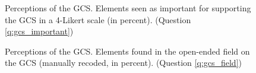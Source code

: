 \begin{figure}[h!]
    \caption[Perceptions of the GCS]{Perceptions of the GCS. Elements seen as important for supporting the GCS in a 4-Likert scale (in percent). (Question \ref{q:gcs_important})}\label{fig:gcs_important}
\end{figure}

\begin{figure}[h!]
    \caption[Classification of open-ended field on the GCS]{Perceptions of the GCS. Elements found in the open-ended field on the GCS (manually recoded, in percent). (Question \ref{q:gcs_field})}\label{fig:gcs_field}
\end{figure}

